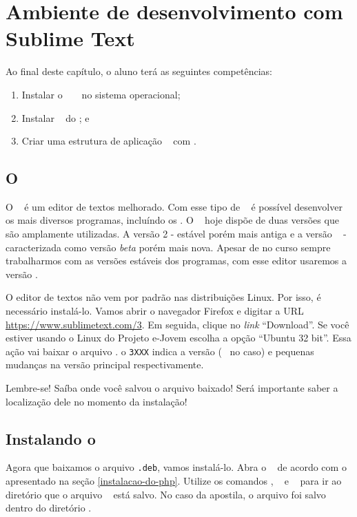 \chapter{Ambiente de desenvolvimento com Sublime Text}
\label{cap2}

Ao final deste capítulo, o aluno terá as seguintes competências:
\begin{enumerate}
	\item Instalar o \sublime~ \sublimeversao~ no sistema operacional;
	\item Instalar \plugins~ do \sublime; e
	\item Criar uma estrutura de aplicação \web~ com \php. 
\end{enumerate}

\section{O \sublime}
\label{o-sublime}

O \sublime~ é um editor de textos melhorado. Com esse tipo de \software~
é possível desenvolver os mais diversos programas, incluíndo os \sites. 
O \sublime~ hoje dispõe de duas versões que são amplamente utilizadas. 
A versão 2 - estável porém mais antiga e a versão \sublimeversao~ - caracterizada como 
versão \textit{beta} porém mais nova. Apesar de no curso sempre trabalharmos com 
as versões estáveis dos programas, com esse editor usaremos a versão \sublimeversao.

O editor de textos não vem por padrão nas distribuições Linux. Por isso, é necessário instalá-lo. 
Vamos abrir o navegador Firefox e digitar a URL \url{https://www.sublimetext.com/3}.
Em seguida, clique no \textit{link} ``Download''. Se você estiver usando o Linux do Projeto e-Jovem
escolha a opção ``Ubuntu 32 bit''. Essa ação vai baixar o arquivo \sublimefilename.
o \texttt{3XXX} indica a versão (\sublimeversao~ no caso) e pequenas mudanças na 
versão principal respectivamente.

Lembre-se! Saíba onde você salvou o arquivo baixado! Será importante saber a 
localização dele no momento da instalação!

\section{Instalando o \sublime}
\label{instalando-o-sublime}

Agora que baixamos o arquivo \texttt{.deb}, vamos instalá-lo. Abra o \terminal~ de acordo
com o apresentado na seção \ref{instalacao-do-php}. Utilize os comandos \comandocdcompleto, 
\comandolscompleto~ e \comandopwdcompleto~ para ir ao diretório que o arquivo 
\sublimefilename~ está salvo. No caso da apostila, o arquivo foi salvo dentro do 
diretório .

